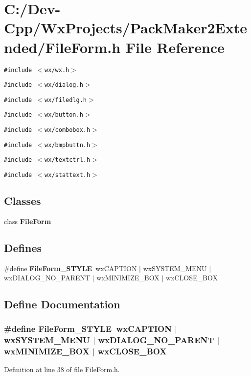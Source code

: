\section{C:/Dev-Cpp/Wx\-Projects/Pack\-Maker2Extended/File\-Form.h File Reference}
\label{_file_form_8h}
{\tt \#include $<$wx/wx.h$>$}\par
{\tt \#include $<$wx/dialog.h$>$}\par
{\tt \#include $<$wx/filedlg.h$>$}\par
{\tt \#include $<$wx/button.h$>$}\par
{\tt \#include $<$wx/combobox.h$>$}\par
{\tt \#include $<$wx/bmpbuttn.h$>$}\par
{\tt \#include $<$wx/textctrl.h$>$}\par
{\tt \#include $<$wx/stattext.h$>$}\par
\subsection*{Classes}
\begin{CompactItemize}
\item 
class {\bf File\-Form}
\end{CompactItemize}
\subsection*{Defines}
\begin{CompactItemize}
\item 
\#define {\bf File\-Form\_\-STYLE}~wx\-CAPTION $|$ wx\-SYSTEM\_\-MENU $|$ wx\-DIALOG\_\-NO\_\-PARENT $|$ wx\-MINIMIZE\_\-BOX $|$ wx\-CLOSE\_\-BOX
\end{CompactItemize}


\subsection{Define Documentation}
\subsubsection{\setlength{\rightskip}{0pt plus 5cm}\#define File\-Form\_\-STYLE~wx\-CAPTION $|$ wx\-SYSTEM\_\-MENU $|$ wx\-DIALOG\_\-NO\_\-PARENT $|$ wx\-MINIMIZE\_\-BOX $|$ wx\-CLOSE\_\-BOX}\label{_file_form_8h_685b1de1e54ad78e4658f1bde33daaa0}




Definition at line 38 of file File\-Form.h.